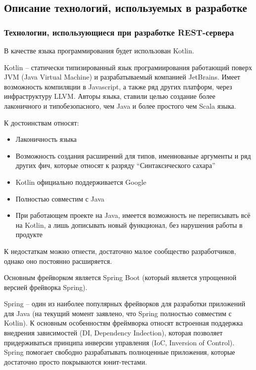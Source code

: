 \subsection{Описание технологий, используемых в разработке}\label{subsec:2-tech-review}\indent


\subsubsection{Технологии, использующиеся при разработке REST-сервера}\indent

В качестве языка программирования будет использован Kotlin.

Kotlin – статически типизированный язык програмиирования работающий поверх JVM (Java Virtual Machine) и разрабатываемый компанией JetBrains. Имеет возможность компиляции в Javascript, а также ряд других платформ, через инфраструктуру LLVM. Авторы языка, ставили целью создание более лаконичного и типобезопасного, чем Java и более простого чем Scala языка.

К достоинствам относят:
\begin{itemize}
    \item Лаконичность языка
    \item Возможность создания расширений для типов, именнованые аргументы и ряд других фич, которые относят к разряду “Синтаксического сахара”
    \item Kotlin официально поддерживается Google
    \item Полностью совместим с Java
    \item При работающем проекте на Java, имеется возможность не переписывать всё на Kotlin, а лишь дописывать новый функционал, без нарушения работы в продукте
\end{itemize}

К недостаткам можно отнести, достаточно малое сообщество разработчиков, однако оно постоянно расширяется.

Основным фрейворком является Spring Boot (который является упрощенной версией фрейворка Spring).

Spring – один из наиболее популярных фрейворков для разработки приложений для Java (на текущий момент заявлено, что Spring полностью совместим с Kotlin).
К основным особенностям фреймворка относят встроенная поддержка внедрения зависимостей (DI, Dependency Indection), которая позволяет придерживаться принципа инверсии управления (IoC, Inversion of Control).
Spring помогает свободно разрабатывать полноценные приложения, которые достаточно просто покрываются юнит-тестами.

